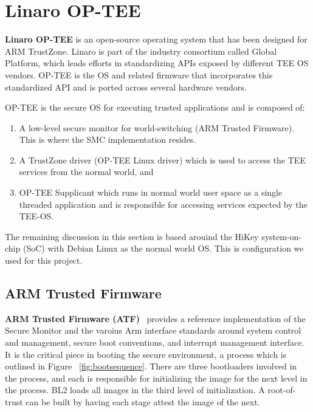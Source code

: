 \section{Linaro OP-TEE}

\textbf{Linaro OP-TEE} is an open-source operating system that has been designed for ARM
TrustZone. Linaro is part of the industry consortium called Global Platform, which leads efforts in standardizing APIs exposed by different TEE OS vendors. OP-TEE is the OS and related firmware that incorporates this standardized API and is ported across several hardware vendors. 

OP-TEE is the secure OS for executing trusted applications and is composed of:
\begin{enumerate}
    \item A low-level secure monitor for world-switching (ARM Trusted Firmware). This is where the SMC implementation resides.
    \item A TrustZone driver (OP-TEE Linux driver) which is used to access the TEE services from the normal world, and
    \item OP-TEE Supplicant which runs in normal world user space as a single threaded application and is responsible for accessing services expected by the TEE-OS. 
\end{enumerate}

The remaining discussion in this section is based arouind the HiKey system-on-chip (SoC) with Debian Linux as the normal world OS. This is configuration we used for this project. 

\subsection{ARM Trusted Firmware}
\textbf{ARM Trusted Firmware (ATF)}~\cite{atf} provides a reference implementation of the Secure Monitor and the varoius Arm interface standards around system control and management, secure boot conventions, and interrupt management interface. It is the critical piece in booting the secure environment, a process which is outlined in Figure ~\ref{fig:bootsequence}. There are three bootloaders involved in the process, and each is responsible for initializing the image for the next level in the process. BL2 loads all images in the third level of initialization. A root-of-trust can be built by having each stage attest the image of the next. 


